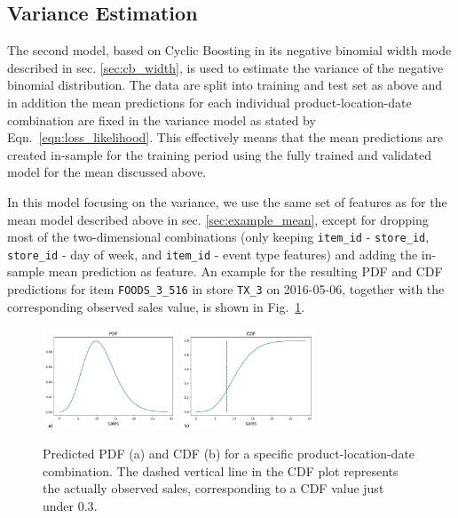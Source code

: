 \documentclass[BCOR=1mm, DIV=calc,10pt,
twoside=true,
twocolumn,
headings=normal]{scrartcl}
\newcommand{\fig}{Fig.~}
\newcommand{\eqn}{Eqn.~}
\begin{document}
\subsection{Variance Estimation}

The second model, based on Cyclic Boosting in its negative binomial width mode described in sec. \ref{sec:cb_width}, is used to estimate the variance of the negative binomial distribution. The data are split into training and test set as above and in addition the mean predictions for each individual product-location-date combination are fixed in the variance model as stated by \eqn \eqref{eqn:loss_likelihood}. This effectively means that the mean predictions are created in-sample for the training period using the fully trained and validated model for the mean discussed above.

\noindent
In this model focusing on the variance, we use the same set of features as for the mean model described above in sec. \ref{sec:example_mean}, except for dropping most of the two-dimensional combinations (only keeping \texttt{item\_id} - \texttt{store\_id}, \texttt{store\_id} - day of week, and \texttt{item\_id} - event type features) and adding the in-sample mean prediction as feature. An example for the resulting PDF and CDF predictions for item \texttt{FOODS\_3\_516} in store \texttt{TX\_3} on 2016-05-06, together with the corresponding observed sales value, is shown in \fig \ref{fig:pdf_example}.

\begin{figure}
\begin{center}
\includegraphics[width=4cm]{figs/pdf}
\includegraphics[width=4cm]{figs/cdf}
\caption{\label{fig:pdf_example} Predicted PDF (a) and CDF (b) for a specific product-location-date combination. The dashed vertical line in the CDF plot represents the actually observed sales, corresponding to a CDF value just under $0.3$.}
\end{center}
\end{figure}
\end{document}
